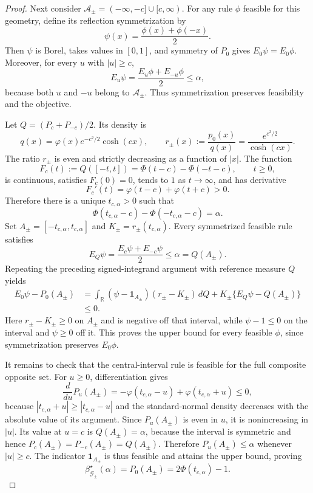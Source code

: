 \documentclass{article}
\begin{document}
\begin{proof}
Next consider \(\mathcal A_{\pm}=(-\infty,-c]\cup[c,\infty)\).  For any rule \(\phi\) feasible for this geometry, define its reflection symmetrization by
\[
 \psi(x)=\frac{\phi(x)+\phi(-x)}{2}.
\]
Then \(\psi\) is Borel, takes values in \([0,1]\), and symmetry of \(P_0\) gives \(E_0\psi=E_0\phi\).  Moreover, for every \(u\) with \(|u|\geq c\),
\[
 E_u\psi=\frac{E_u\phi+E_{-u}\phi}{2}\leq\alpha,
\]
because both \(u\) and \(-u\) belong to \(\mathcal A_{\pm}\).  Thus symmetrization preserves feasibility and the objective.

Let \(Q=(P_c+P_{-c})/2\).  Its density is
\[
 q(x)=\varphi(x)e^{-c^2/2}\cosh(cx),
 \qquad
 r_{\pm}(x):=\frac{p_0(x)}{q(x)}
 =\frac{e^{c^2/2}}{\cosh(cx)}.
\]
The ratio \(r_{\pm}\) is even and strictly decreasing as a function of \(|x|\).  The function
\[
 F_c(t):=Q([-t,t])=\Phi(t-c)-\Phi(-t-c),\qquad t\geq0,
\]
is continuous, satisfies \(F_c(0)=0\), tends to \(1\) as \(t\to\infty\), and has derivative
\[
 F_c'(t)=\varphi(t-c)+\varphi(t+c)>0.
\]
Therefore there is a unique \(t_{c,\alpha}>0\) such that
\[
 \Phi(t_{c,\alpha}-c)-\Phi(-t_{c,\alpha}-c)=\alpha.
\]
Set \(A_{\pm}=[-t_{c,\alpha},t_{c,\alpha}]\) and \(K_{\pm}=r_{\pm}(t_{c,\alpha})\).  Every symmetrized feasible rule satisfies
\[
 E_Q\psi=\frac{E_c\psi+E_{-c}\psi}{2}\leq\alpha=Q(A_{\pm}).
\]
Repeating the preceding signed-integrand argument with reference measure \(Q\) yields
\[
 \begin{aligned}
 E_0\psi-P_0(A_{\pm})
 &=\int_{\mathbb R}(\psi-\mathbf 1_{A_{\pm}})(r_{\pm}-K_{\pm})\,dQ
   +K_{\pm}\{E_Q\psi-Q(A_{\pm})\}\\
 &\leq0.
 \end{aligned}
\]
Here \(r_{\pm}-K_{\pm}\geq0\) on \(A_{\pm}\) and is negative off that interval, while \(\psi-1\leq0\) on the interval and \(\psi\geq0\) off it.  This proves the upper bound for every feasible \(\phi\), since symmetrization preserves \(E_0\phi\).

It remains to check that the central-interval rule is feasible for the full composite opposite set.  For \(u\geq0\), differentiation gives
\[
 \frac{d}{du}P_u(A_{\pm})
 =-\varphi(t_{c,\alpha}-u)+\varphi(t_{c,\alpha}+u)\leq0,
\]
because \(|t_{c,\alpha}+u|\geq|t_{c,\alpha}-u|\) and the standard-normal density decreases with the absolute value of its argument.  Since \(P_u(A_{\pm})\) is even in \(u\), it is nonincreasing in \(|u|\).  Its value at \(u=c\) is \(Q(A_{\pm})=\alpha\), because the interval is symmetric and hence \(P_c(A_{\pm})=P_{-c}(A_{\pm})=Q(A_{\pm})\).  Therefore \(P_u(A_{\pm})\leq\alpha\) whenever \(|u|\geq c\).  The indicator \(\mathbf 1_{A_{\pm}}\) is thus feasible and attains the upper bound, proving
\[
 \beta^{\star}_{\mathcal G_{\pm}}(\alpha)
 =P_0(A_{\pm})=2\Phi(t_{c,\alpha})-1.
\]


\end{proof}
\end{document}
